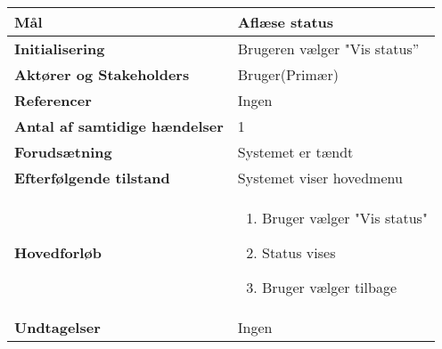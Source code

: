 \begin{table}[H] \centering
\begin{tabular}{|p{6cm}|p{8cm}|}
	\hline
		\textbf{Mål}	&
			Aflæse status \\\hline
		\textbf{Initialisering} &
			Brugeren vælger "Vis status” \\\hline
		\textbf{Aktører og Stakeholders} &
			Bruger(Primær) \\\hline
		\textbf{Referencer} &
			Ingen \\\hline
		\textbf{Antal af samtidige hændelser} &
			1 \\\hline
		\textbf{Forudsætning} &
			Systemet er tændt \\\hline
		\textbf{Efterfølgende tilstand} &
			Systemet viser hovedmenu \\\hline
		\textbf{Hovedforløb} &
		
		\begin{enumerate}
			\item Bruger vælger "Vis status"
			\item Status vises
			\item Bruger vælger tilbage
		\end{enumerate} \\\hline
		
		\textbf{Undtagelser} &
			Ingen \\\hline
	\end{tabular}
	\label{UC3} 
\end{table}